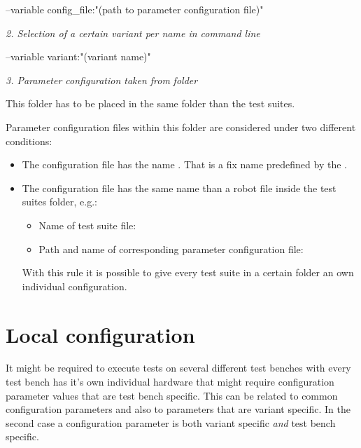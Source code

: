 \begin{robotlog}
--variable config_file:"(path to parameter configuration file)"
\end{robotlog}

\textit{2. Selection of a certain variant per name in command line}

\begin{robotlog}
--variable variant:"(variant name)"
\end{robotlog}

\textit{3. Parameter configuration taken from}  \textit{folder}

This  folder has to be placed in the same folder than the test suites.

Parameter configuration files within this folder are considered under two different conditions:

\begin{itemize}
   \item The configuration file has the name . That is a fix name predefined by the \pkg.
   \item The configuration file has the same name than a robot file inside the test suites folder, e.g.:
         \begin{itemize}
            \item Name of test suite file: 
            \item Path and name of corresponding parameter configuration file: 
         \end{itemize}
         With this rule it is possible to give every test suite in a certain folder an own individual configuration.
\end{itemize}

\newpage

\section{Local configuration}

It might be required to execute tests on several different test benches with every test bench has it's own individual hardware
that might require configuration parameter values that are test bench specific. This can be related to common configuration parameters
and also to parameters that are variant specific. In the second case a configuration parameter is both variant specific \textit{and}
test bench specific.

